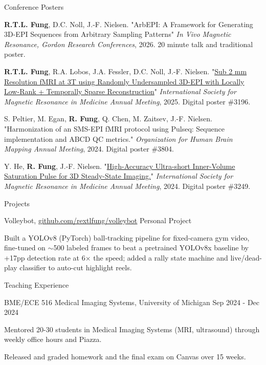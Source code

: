\documentclass{resume}
\begin{document}
\begin{rSection}{Conference Posters}
\begin{rConference}
    \item \textbf{R.T.L. Fung}, D.C. Noll, J.-F. Nielsen.
    "ArbEPI: A Framework for Generating 3D-EPI Sequences from Arbitrary Sampling Patterns"
    \textit{In Vivo Magnetic Resonance, Gordon Research Conferences}, 2026. 20 minute talk and traditional poster.

    \item \textbf{R.T.L. Fung}, R.A. Lobos, J.A. Fessler, D.C. Noll, J.-F. Nielsen.
    "\href{https://archive.ismrm.org/2025/3196.html}{Sub 2 mm Resolution fMRI at 3T using Randomly Undersampled 3D-EPI with Locally Low-Rank + Temporally Sparse Reconstruction}"
    \textit{International Society for Magnetic Resonance in Medicine Annual Meeting}, 2025. Digital poster \#3196.

    \item S. Peltier, M. Egan, \textbf{R. Fung}, Q. Chen, M. Zaitsev, J.-F. Nielsen.
    "Harmonization of an SMS-EPI fMRI protocol using Pulseq: Sequence implementation and ABCD QC metrics."
    \textit{Organization for Human Brain Mapping Annual Meeting}, 2024. Digital poster \#3804.

    \item Y. He, \textbf{R. Fung}, J.-F. Nielsen.
    "\href{https://archive.ismrm.org/2024/3249.html}{High-Accuracy Ultra-short Inner-Volume Saturation Pulse for 3D Steady-State Imaging.}"
    \textit{International Society for Magnetic Resonance in Medicine Annual Meeting}, 2024. Digital poster \#3249.
\end{rConference}
\end{rSection}

\begin{rSection}{Projects}
    \begin{rSubsection}{Volleybot}{, \href{https://github.com/rextlfung/volleybot}{\underline{github.com/rextlfung/volleybot}} \hfill {Personal Project}}
            \item Built a YOLOv8 (PyTorch) ball-tracking pipeline for fixed-camera gym video, fine-tuned on $\sim$500 labeled frames to beat a pretrained YOLOv8x baseline by +17pp detection rate at 6$\times$ the speed; added a rally state machine and live/dead-play classifier to auto-cut highlight reels.
	\end{rSubsection}
\end{rSection}

\begin{rSection}{Teaching Experience}
    \begin{rSubsection}{BME/ECE 516 Medical Imaging Systems}{, University of Michigan \hfill {Sep 2024 - Dec 2024}}
        \item[$\bullet$] Mentored 20-30 students in Medical Imaging Systems (MRI, ultrasound) through weekly office hours and Piazza.
        \item[$\bullet$] Released and graded homework and the final exam on Canvas over 15 weeks.
    \end{rSubsection}
\end{rSection}
\end{document}
